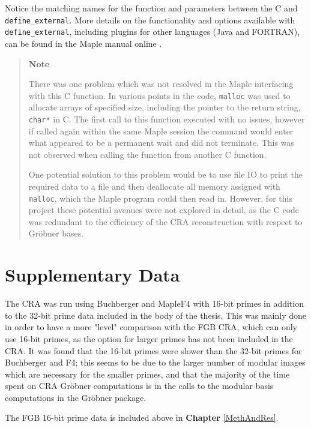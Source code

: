 \documentclass[letterpaper,12pt,titlepage,oneside,final]{book}
\newenvironment{note}{\begin{quote}%
  \textbf{Note }%
  \quad
}{%
\end{quote}%
}
\begin{document}
\begin{appendices}
\noindent Notice the matching names for the function and parameters between the C and \\\texttt{define\_external}.  More details on the functionality and options available with \\\texttt{define\_external}, including plugins for other languages (Java and FORTRAN), \\can be found in the Maple manual online \cite{Maple}. 

\begin{note}
  There was one problem which was not resolved in the Maple interfacing with this C function.  In various points in the code, \texttt{malloc} was used to allocate arrays of specified size, including the pointer to the return string, \texttt{char*} in C.  The first call to this function executed with no issues, however if called again within the same Maple session the command would enter what appeared to be a permanent wait and did not terminate.  This was not observed when calling the function from another C function.

  One potential solution to this problem would be to use file IO to print the required data to a file and then deallocate all memory assigned with \texttt{malloc}, which the Maple program could then read in.  However, for this project these potential avenues were not explored in detail, as the C code was redundant to the efficiency of the CRA reconstruction with respect to Gr\"obner bases.   
\end{note}

\chapter{Supplementary Data}\label{appendix:supplData}

The CRA was run using Buchberger and MapleF4 with 16-bit primes in addition to the 32-bit prime data included in the body of the thesis.  This was mainly done in order to have a more "level" comparison with the FGB CRA, which can only use 16-bit primes, as the option for larger primes has not been included in the CRA.  It was found that the 16-bit primes were slower than the 32-bit primes for Buchberger and F4; this seems to be due to the larger number of modular images which are necessary for the smaller primes, and that the majority of the time spent on CRA Gr\"obner computations is in the calls to the modular basis computations in the Gr\"obner package.

The FGB 16-bit prime data is included above in \textbf{Chapter} \ref{MethAndRes}.  


\end{appendices}
\end{document}
